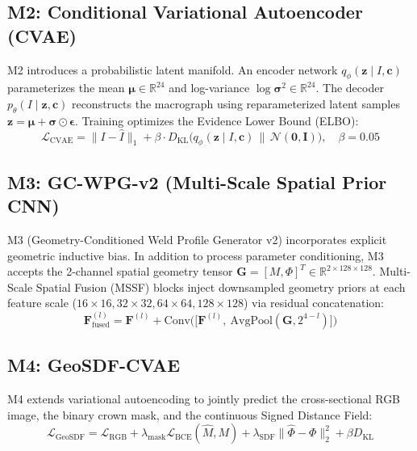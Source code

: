 \documentclass[12pt,a4paper,oneside]{report}
\begin{document}
\subsection{M2: Conditional Variational Autoencoder (CVAE)}
M2 introduces a probabilistic latent manifold. An encoder network $q_\phi(\mathbf{z} \mid I, \mathbf{c})$ parameterizes the mean $\boldsymbol{\mu} \in \mathbb{R}^{24}$ and log-variance $\log \boldsymbol{\sigma}^2 \in \mathbb{R}^{24}$. The decoder $p_\theta(I \mid \mathbf{z}, \mathbf{c})$ reconstructs the macrograph using reparameterized latent samples $\mathbf{z} = \boldsymbol{\mu} + \boldsymbol{\sigma} \odot \boldsymbol{\epsilon}$. Training optimizes the Evidence Lower Bound (ELBO):
\begin{equation}
    \mathcal{L}_{\text{CVAE}} = \|I - \hat{I}\|_1 + \beta \cdot D_{\text{KL}}\big(q_\phi(\mathbf{z} \mid I, \mathbf{c}) \,\|\, \mathcal{N}(\mathbf{0}, \mathbf{I})\big), \quad \beta = 0.05
\end{equation}

\subsection{M3: GC-WPG-v2 (Multi-Scale Spatial Prior CNN)}
M3 (Geometry-Conditioned Weld Profile Generator v2) incorporates explicit geometric inductive bias. In addition to process parameter conditioning, M3 accepts the 2-channel spatial geometry tensor $\mathbf{G} = [M, \Phi]^T \in \mathbb{R}^{2 \times 128 \times 128}$. Multi-Scale Spatial Fusion (MSSF) blocks inject downsampled geometry priors at each feature scale ($16\times 16, 32\times 32, 64\times 64, 128\times 128$) via residual concatenation:
\begin{equation}
    \mathbf{F}_{\text{fused}}^{(l)} = \mathbf{F}^{(l)} + \text{Conv}\Big(\big[\mathbf{F}^{(l)},\ \text{AvgPool}(\mathbf{G}, 2^{4-l})\big]\Big)
\end{equation}

\subsection{M4: GeoSDF-CVAE}
M4 extends variational autoencoding to jointly predict the cross-sectional RGB image, the binary crown mask, and the continuous Signed Distance Field:
\begin{equation}
    \mathcal{L}_{\text{GeoSDF}} = \mathcal{L}_{\text{RGB}} + \lambda_{\text{mask}} \mathcal{L}_{\text{BCE}}(\hat{M}, M) + \lambda_{\text{SDF}} \|\hat{\Phi} - \Phi\|_2^2 + \beta D_{\text{KL}}
\end{equation}
\end{document}
